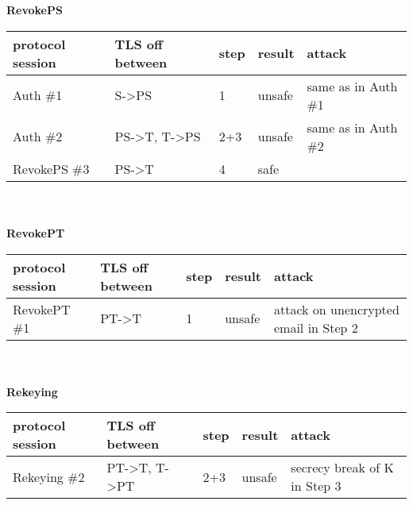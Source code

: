 \\ \\
\textbf{RevokePS}\\
\begin{tabular}[h]{| l | l | l | l | l |}
\hline
protocol session & TLS off between & step & result & attack \\ \hline
Auth \#1         & S->PS           & 1    & unsafe & same as in Auth \#1 \\ \hline
Auth \#2         & PS->T, T->PS    & 2+3  & unsafe & same as in Auth \#2 \\ \hline
RevokePS \#3     & PS->T           & 4    & safe   & \\ \hline
\end{tabular}
\\ \\
\textbf{RevokePT}\\
\begin{tabular}[h]{| l | l | l | l | l |}
\hline
protocol session & TLS off between & step & result & attack \\ \hline
RevokePT \#1     & PT->T           & 1    & unsafe   & attack on unencrypted email in Step 2\\ \hline
\end{tabular}
\\ \\
\textbf{Rekeying}\\
\begin{tabular}[h]{| l | l | l | l | l |}
\hline
protocol session & TLS off between & step & result & attack \\ \hline
Rekeying \#2     & PT->T, T->PT    & 2+3  & unsafe   & secrecy break of K in Step 3 \\ \hline
\end{tabular}